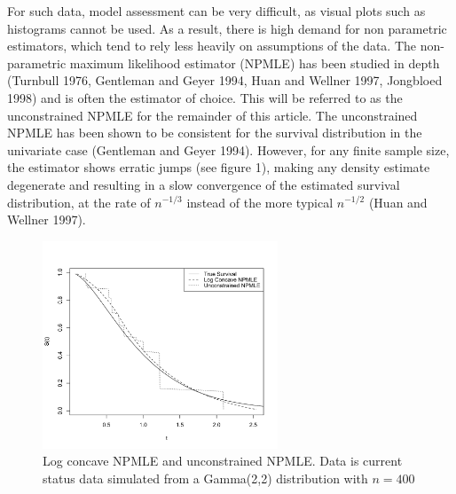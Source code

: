 \documentclass[10pt]{article}
\begin{document}
	For such data, model assessment can be very difficult, as visual plots such as histograms cannot be used. As a result, there is high demand for non parametric estimators, which tend to rely less heavily on assumptions of the data. The non-parametric maximum likelihood estimator (NPMLE) has been studied in depth (Turnbull 1976, Gentleman and Geyer 1994, Huan and Wellner 1997, Jongbloed 1998) and is often the estimator of choice. This will be referred to as the unconstrained NPMLE for the remainder of this article. The unconstrained NPMLE has been shown to be consistent for the survival distribution in the univariate case (Gentleman and Geyer 1994). However, for any finite sample size, the estimator shows erratic jumps (see figure 1), making any density estimate degenerate and resulting in a slow convergence of the estimated survival distribution, at the rate of $n^{-1/3}$ instead of the more typical $n^{-1/2}$ (Huan and Wellner 1997). 
	
\begin{figure}[h]
\centerline{\includegraphics[width = 7cm]{LCvUC.pdf} }
\caption{Log concave NPMLE and unconstrained NPMLE. Data is current status data simulated from a Gamma(2,2) distribution with $n = 400$ }
\end{figure}		
			
\end{document}
